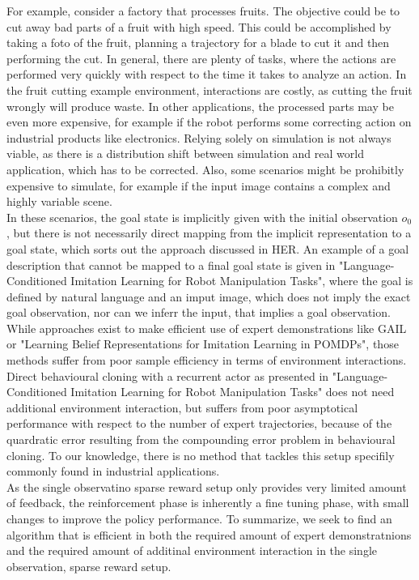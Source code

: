 For example, consider a factory that processes fruits. The objective could be to cut away bad parts of a fruit with high speed. This could be accomplished by 
taking a foto of the fruit, planning a trajectory for a blade to cut it and then performing the cut. In general, there are plenty of tasks, where the actions are 
performed very quickly with respect to the time it takes to analyze an action. In the fruit cutting example environment, interactions are costly, as cutting 
the fruit wrongly will produce waste. 
In other applications, the processed parts may be even more expensive, for example if the robot performs some correcting action on industrial products like 
electronics. Relying solely on simulation is not always viable, as there is a distribution shift between simulation and real world application, which has to be 
corrected. Also, some scenarios might be prohibitly expensive to simulate, for example if the input image contains a complex and highly variable scene.\\
In these scenarios, the goal state is implicitly given with the initial observation $o_0$, 
but there is not necessarily direct mapping from the implicit representation to a goal state, which sorts out the approach discussed in HER. 
An example of a goal description that cannot be mapped to a final goal state is given in "Language-Conditioned Imitation Learning for Robot Manipulation Tasks", 
where the goal is defined by natural language and an imput image, which does not imply the exact goal observation, nor can we inferr the input, that implies a 
goal observation. \\
While approaches exist to make efficient use of expert demonstrations like GAIL or "Learning Belief Representations for Imitation Learning in POMDPs", 
those methods suffer from poor sample efficiency in terms of environment interactions. Direct behavioural cloning with a recurrent actor as presented in 
"Language-Conditioned Imitation Learning for Robot Manipulation Tasks" does not need additional environment interaction, but suffers from poor asymptotical 
performance with respect to the number of expert trajectories, because of the quardratic error resulting from the compounding error problem in behavioural cloning. 
To our knowledge, there is no method that tackles this setup specifily commonly found in industrial applications. \\
As the single observatino sparse reward setup only provides very limited amount of feedback, the reinforcement phase is inherently a fine tuning phase, with 
small changes to improve the policy performance. To summarize, we seek to find an algorithm that is efficient in both the required amount of expert demonstratnions 
and the required amount of additinal environment interaction in the single observation, sparse reward setup.